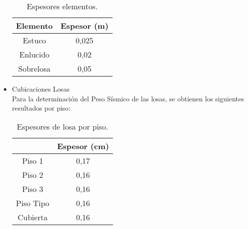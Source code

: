 \documentclass[letterpaper,11pt]{article} %
\begin{document}
\begin{itemize}
            \begin{table}[H]
              \centering
              \caption{Espesores elementos.}
                \begin{tabular}{|c|c|}
                \hline
                \textbf{Elemento} &
                  \textbf{Espesor (m)}
                  \bigstrut\\
                \hline
                Estuco &
                  0,025
                  \bigstrut\\
                \hline
                Enlucido &
                  0,02
                  \bigstrut\\
                \hline
                Sobrelosa &
                  0,05
                  \bigstrut\\
                \hline
                \end{tabular}%
              \label{Espesor}%
            \end{table}%

        \newpage
        \item Cubicaciones Losas\\
        Para la determinación del Peso Sísmico de las losas, se obtienen los siguientes resultados por piso:
         
            \begin{table}[H]
              \centering
              \caption{Espesores de losa por piso.}
                \begin{tabular}{|c|c|}
            \cline{2-2}    \multicolumn{1}{c|}{} &
                  \textbf{Espesor (cm)}
                  \bigstrut\\
                \hline
                Piso 1 &
                  0,17
                  \bigstrut[t]\\
                Piso 2  &
                  0,16
                  \\
                Piso 3  &
                  0,16
                  \\
                Piso Tipo &
                  0,16
                  \\
                Cubierta &
                  0,16
                  \bigstrut[b]\\
                \hline
                \end{tabular}%
              \label{Espesor losas}%
            \end{table}%
         

\end{itemize}
\end{document}
